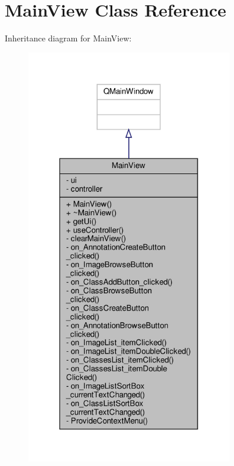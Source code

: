 \hypertarget{classMainView}{}\section{Main\+View Class Reference}
\label{classMainView}


Inheritance diagram for Main\+View\+:
\nopagebreak
\begin{figure}[H]
\begin{center}
\leavevmode
\includegraphics[width=255pt]{classMainView__inherit__graph}
\end{center}
\end{figure}


